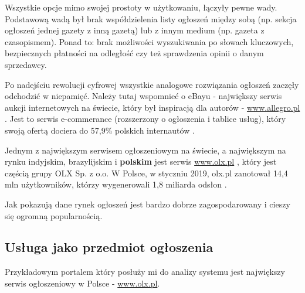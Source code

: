 \documentclass[12pt]{article}
\numberwithin{figure}{section}
\begin{document}
\begin{sloppypar}
Wszystkie opcje mimo swojej prostoty w użytkowaniu, łączyły pewne wady. Podstawową wadą był brak współdzielenia listy ogłoszeń między sobą (np. sekcja ogłoszeń jednej gazety z inną gazetą) lub z innym medium (np. gazeta z czasopismem). Ponad to: brak możliwości wyszukiwania po słowach kluczowych, bezpiecznych płatności na odległość czy też sprawdzenia opinii o danym sprzedawcy.

Po nadejściu rewolucji cyfrowej wszystkie analogowe rozwiązania ogłoszeń zaczęły odchodzić w niepamięć. Należy tutaj wspomnieć o eBayu - największy serwis aukcji internetowych na świecie, który był inspiracją dla autorów - \url{www.allegro.pl} \cite{allegro-wywiad}. Jest to serwis e-commerance (rozszerzony o ogłoszenia i tablice usług), który swoją ofertą dociera do 57,9\% polskich internautów \cite{allegro-liczby}. 

Jednym z największym serwisem ogłoszeniowym na świecie, a największym na rynku indyjskim, brazylijskim i \textbf{polskim} jest serwis \url{www.olx.pl} \cite{olx-wywiad}, który jest częścią grupy OLX Sp. z o.o. W Polsce, w styczniu 2019, olx.pl zanotował 14,4 mln użytkowników, którzy wygenerowali 1,8 miliarda odsłon \cite{olx-liczby}.

Jak pokazują dane rynek ogłoszeń jest bardzo dobrze zagospodarowany i cieszy się ogromną popularnością.
\subsection{Usługa jako przedmiot ogłoszenia}
Przykładowym portalem który posłuży mi do analizy systemu jest największy serwis ogłoszeniowy w Polsce - \url{www.olx.pl}.


\end{sloppypar}
\end{document}
